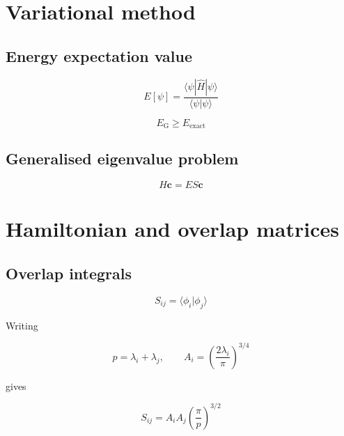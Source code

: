 \section{Variational method}

\subsection{Energy expectation value}


\begin{equation}
    E[\psi]=
    \frac{\langle\psi|\hat H|\psi\rangle}
    {\langle\psi|\psi\rangle}
    \label{eq:energy_functional}
\end{equation}

\begin{equation}
    E_{\mathrm G}\geq E_{\mathrm{exact}}
    \label{eq:variational_bound}
\end{equation}


\subsection{Generalised eigenvalue problem}


\begin{equation}
    H\mathbf c=ES\mathbf c
    \label{eq:generalised_eigenproblem}
\end{equation}

\section{Hamiltonian and overlap matrices}

\subsection{Overlap integrals}

\begin{equation}
    S_{ij}=
    \langle\phi_i|\phi_j\rangle
    \label{eq:overlap_definition}
\end{equation}

Writing

\begin{equation}
    p=\lambda_i+\lambda_j,
    \qquad
    A_i=
    \left(\frac{2\lambda_i}{\pi}\right)^{3/4}
\end{equation}

gives

\begin{equation}
    S_{ij}=
    A_iA_j\left(\frac{\pi}{p}\right)^{3/2}
    \label{eq:overlap_matrix}
\end{equation}


